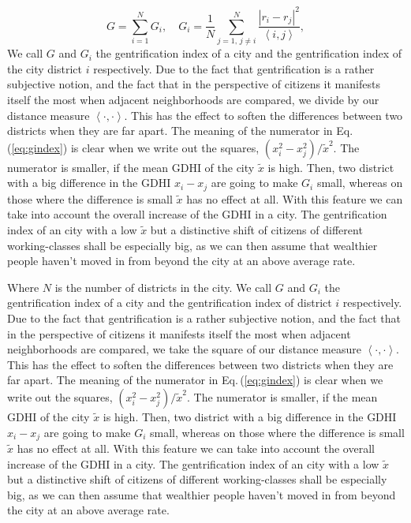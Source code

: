 \documentclass[a4paper, 10pt, conference]{ieeeconf}      %
\begin{document}
\begin{equation}
G=\sum_{i=1}^{N}G_{i},\quad G_{i}=\frac1{N}\sum_{j=1,\,j\neq i}^{N}\frac{\left|r_{i}-r_{j}\right|^{2}}{\left\langle i,j\right\rangle },
\label{eq:gindex}
\end{equation}
We call $G$ and $G_{i}$ the gentrification index of a city and the gentrification index of the city district $i$ respectively. Due to the fact that gentrification is a rather subjective notion, and the fact that in the perspective of citizens it manifests itself the most when adjacent neighborhoods are compared, we divide by our distance measure $\left\langle \cdot,\cdot\right\rangle $. This has the effect to soften the differences between two districts when they are far apart. The meaning of the numerator in Eq.$\,$(\ref{eq:gindex}) is clear when we write out the squares, $\left(x_{i}^{2}-x_{j}^{2}\right)/\tilde{x}^{2}.$ The numerator is smaller, if the mean GDHI of the city $\tilde{x}$ is high. Then, two district with a big difference in the GDHI $x_{i}-x_{j}$ are going to make $G_{i}$ small, whereas on those where the difference is small $\tilde{x}$ has no effect at all. With this feature we can take into account the overall increase of the GDHI in a city. The gentrification index of an city with a low $\tilde{x}$ but a distinctive shift of citizens of different working-classes shall be especially big, as we can then assume that wealthier people haven't moved in from beyond the city at an above average rate.

Where $N$ is the number of districts in the city.
We call $G$ and $G_{i}$ the gentrification index of a city and the gentrification index of district $i$ respectively.
Due to the fact that gentrification is a rather subjective notion, and the fact that in the perspective of citizens it manifests 
itself the most when adjacent neighborhoods are compared, we take the square of our distance measure $\left\langle \cdot,\cdot\right\rangle $.
This has the effect to soften the differences between two districts when they are far apart. The meaning of the numerator in Eq.$\,$(\ref{eq:gindex})
is clear when we write out the squares, $\left(x_{i}^{2}-x_{j}^{2}\right)/\tilde{x}^{2}.$ The numerator is smaller, 
if the mean GDHI of the city $\tilde{x}$ is high. Then, two district with a big difference in the GDHI $x_{i}-x_{j}$ are going 
to make $G_{i}$ small, whereas on those where the difference is small $\tilde{x}$ has no effect at all. With this feature we can 
take into account the overall increase of the GDHI in a city. The gentrification index of an city with a low $\tilde{x}$ but a distinctive 
shift of citizens of different working-classes shall be especially big, as we can then assume that wealthier people haven't moved in from 
beyond the city at an above average rate.
\end{document}
